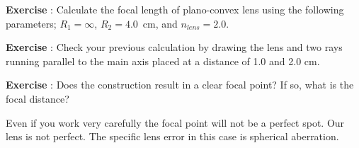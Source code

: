 \documentclass[12pt,a4paper]{article}
\numberwithin{equation}{section}
\numberwithin{figure}{section}
\newcounter{Exercise}
\numberwithin{table}{section}
\begin{document}
\begin{shaded}
\textbf{Exercise \theExercise {}} : Calculate the focal length of plano-convex lens using the following parameters; $R_1=\infty$, $R_2=4.0$~cm, and $n_{lens}=2.0$.\end{shaded}
\begin{shaded}
\textbf{Exercise \theExercise {}} : Check your previous calculation by drawing the lens and two rays running parallel to the main axis placed at a distance of 1.0 and 2.0 cm.\end{shaded}
\begin{shaded}
\textbf{Exercise \theExercise {}} : Does the construction result in a clear focal point? If so, what is the focal distance?\end{shaded}

Even if you work very carefully the focal point will not be a perfect spot. Our lens is not perfect. The specific lens error in this case is spherical aberration.
\end{document}
